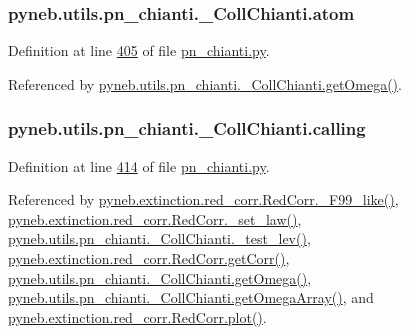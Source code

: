 \subsubsection[{atom}]{\setlength{\rightskip}{0pt plus 5cm}pyneb.\+utils.\+pn\+\_\+chianti.\+\_\+\+Coll\+Chianti.\+atom}\label{classpyneb_1_1utils_1_1pn__chianti_1_1___coll_chianti_a904418982790fd63f2324fec90636bb6}


Definition at line \hyperlink{pn__chianti_8py_source_l00405}{405} of file \hyperlink{pn__chianti_8py_source}{pn\+\_\+chianti.\+py}.



Referenced by \hyperlink{pn__chianti_8py_source_l00484}{pyneb.\+utils.\+pn\+\_\+chianti.\+\_\+\+Coll\+Chianti.\+get\+Omega()}.

\hypertarget{classpyneb_1_1utils_1_1pn__chianti_1_1___coll_chianti_ab58a9cfcb76b7c72b9b815c5700e7aae}{}
\subsubsection[{calling}]{\setlength{\rightskip}{0pt plus 5cm}pyneb.\+utils.\+pn\+\_\+chianti.\+\_\+\+Coll\+Chianti.\+calling}\label{classpyneb_1_1utils_1_1pn__chianti_1_1___coll_chianti_ab58a9cfcb76b7c72b9b815c5700e7aae}


Definition at line \hyperlink{pn__chianti_8py_source_l00414}{414} of file \hyperlink{pn__chianti_8py_source}{pn\+\_\+chianti.\+py}.



Referenced by \hyperlink{red__corr_8py_source_l00658}{pyneb.\+extinction.\+red\+\_\+corr.\+Red\+Corr.\+\_\+\+F99\+\_\+like()}, \hyperlink{red__corr_8py_source_l00176}{pyneb.\+extinction.\+red\+\_\+corr.\+Red\+Corr.\+\_\+set\+\_\+law()}, \hyperlink{pn__chianti_8py_source_l00449}{pyneb.\+utils.\+pn\+\_\+chianti.\+\_\+\+Coll\+Chianti.\+\_\+test\+\_\+lev()}, \hyperlink{red__corr_8py_source_l00211}{pyneb.\+extinction.\+red\+\_\+corr.\+Red\+Corr.\+get\+Corr()}, \hyperlink{pn__chianti_8py_source_l00484}{pyneb.\+utils.\+pn\+\_\+chianti.\+\_\+\+Coll\+Chianti.\+get\+Omega()}, \hyperlink{pn__chianti_8py_source_l00461}{pyneb.\+utils.\+pn\+\_\+chianti.\+\_\+\+Coll\+Chianti.\+get\+Omega\+Array()}, and \hyperlink{red__corr_8py_source_l00303}{pyneb.\+extinction.\+red\+\_\+corr.\+Red\+Corr.\+plot()}.

